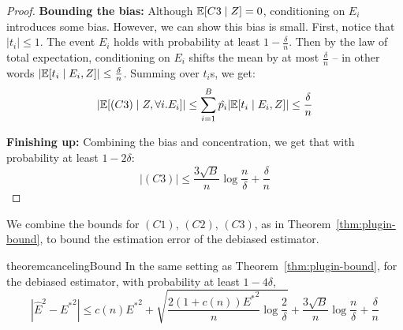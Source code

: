 \begin{proof}
\textbf{Bounding the bias:} Although $\mathbb{E}[C3 \mid Z] = 0$, conditioning on $E_i$ introduces some bias.
However, we can show this bias is small. First, notice that $|t_i| \leq 1$. The event $E_i$ holds with probability at least $1 - \frac{\delta}{n}$. Then by the law of total expectation, conditioning on $E_i$ shifts the mean by at most $\frac{\delta}{n}$ -- in other words $|\mathbb{E}[t_i \mid E_i, Z]| \leq \frac{\delta}{n}$.
Summing over $t_i$s, we get:
\[ \lvert \mathbb{E}[(C3) \mid Z, \forall i. E_i] \rvert \leq \sum_{i=1}^B \hat{p_i} \lvert \mathbb{E}[t_i \mid E_i, Z] \rvert \leq \frac{\delta}{n} \]

\textbf{Finishing up:} Combining the bias and concentration, we get that with probability at least $1 - 2\delta$:
\[ |(C3)| \leq \frac{3\sqrt{B}}{n} \log{\frac{n}{\delta}} + \frac{\delta}{n}\]

\end{proof}

We combine the bounds for $(C1)$, $(C2)$, $(C3)$, as in Theorem~\ref{thm:plugin-bound}, to bound the estimation error of the debiased estimator.

\begin{restatable}{theorem}{cancelingBound}
\label{thm:our-bound}
In the same setting as Theorem~\ref{thm:plugin-bound}, for the debiased estimator, with probability at least $1 - 4\delta$,
\[ | \hat{E}^2 - {E^*}^2 | \leq c(n){E^*}^2 + \sqrt{\frac{2(1+c(n)){E^*}^2}{n} \log{\frac{2}{\delta}}} + \frac{3\sqrt{B}}{n} \log{\frac{n}{\delta}} + \frac{\delta}{n}\]
\end{restatable}

